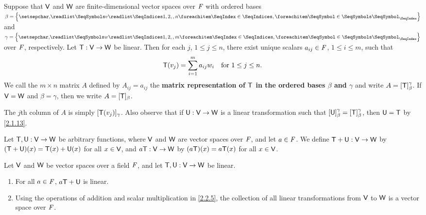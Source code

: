 \begin{defn}\label{2.2.4}
  Suppose that \(\mathsf{V}\) and \(\mathsf{W}\) are finite-dimensional vector spaces over \(\mathit{F}\) with ordered bases \(\beta = \set{\seq{v}{1,2,,n}}\) and \(\gamma = \set{\seq{w}{1,2,,m}}\) over \(\mathit{F}\), respectively.
  Let \(\mathsf{T} : \mathsf{V} \to \mathsf{W}\) be linear.
  Then for each \(j\), \(1 \leq j \leq n\), there exist unique scalars \(a_{i j} \in \mathit{F}\), \(1 \leq i \leq m\), such that
  \[
    \mathsf{T}(v_j) = \sum_{i = 1}^m a_{i j} w_i \quad \text{for } 1 \leq j \leq n.
  \]
  We call the \(m \times n\) matrix \(A\) defined by \(A_{i j} = a_{i j}\) the \textbf{matrix representation of \(\mathsf{T}\) in the ordered bases \(\beta\) and \(\gamma\)} and write \(A = [\mathsf{T}]_{\beta}^{\gamma}\).
  If \(\mathsf{V} = \mathsf{W}\) and \(\beta = \gamma\), then we write \(A = [\mathsf{T}]_{\beta}\).
\end{defn}

\begin{note}
  The \(j\)th column of \(A\) is simply \([\mathsf{T}(v_j)]_{\gamma}\).
  Also observe that if \(\mathsf{U} : \mathsf{V} \to \mathsf{W}\) is a linear transformation such that \([\mathsf{U}]_{\beta}^{\gamma} = [\mathsf{T}]_{\beta}^{\gamma}\), then \(\mathsf{U} = \mathsf{T}\) by \cref{2.1.13}.
\end{note}

\begin{defn}\label{2.2.5}
  Let \(\mathsf{T}, \mathsf{U} : \mathsf{V} \to \mathsf{W}\) be arbitrary functions, where \(\mathsf{V}\) and \(\mathsf{W}\) are vector spaces over \(\mathit{F}\), and let \(a \in \mathit{F}\).
  We define \(\mathsf{T} + \mathsf{U} : \mathsf{V} \to \mathsf{W}\) by \((\mathsf{T} + \mathsf{U})(x) = \mathsf{T}(x) + \mathsf{U}(x)\) for all \(x \in \mathsf{V}\), and \(a \mathsf{T}: \mathsf{V} \to \mathsf{W}\) by \((a \mathsf{T})(x) = a \mathsf{T}(x)\) for all \(x \in \mathsf{V}\).
\end{defn}

\begin{thm}\label{2.7}
  Let \(\mathsf{V}\) and \(\mathsf{W}\) be vector spaces over a field \(\mathit{F}\), and let \(\mathsf{T}, \mathsf{U} : \mathsf{V} \to \mathsf{W}\) be linear.
  \begin{enumerate}
    \item For all \(a \in \mathit{F}\), \(a \mathsf{T} + \mathsf{U}\) is linear.
    \item Using the operations of addition and scalar multiplication in \cref{2.2.5}, the collection of all linear transformations from \(\mathsf{V}\) to \(\mathsf{W}\) is a vector space over \(\mathit{F}\).
  \end{enumerate}
\end{thm}

